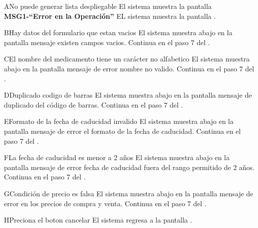  \begin{UCtrayectoriaA}{A}{No puede generar lista despliegable}
 	\UCpaso El sistema muestra la pantalla {\bf MSG1-``Error en la Operación''}
 	\UCpaso EL sistema muestra la pantalla .
 \end{UCtrayectoriaA}
 \begin{UCtrayectoriaA}{B}{Hay datos del formulario que estan vacios}
 	\UCpaso El sistema muestra abajo en la pantalla mensaje existen campos vacios.
 	\UCpaso Continua en el paso 7 del .
 \end{UCtrayectoriaA}		
 \begin{UCtrayectoriaA}{C}{El nombre del medicamento tiene un carácter no alfabetico}
 	\UCpaso El sistema muestra abajo en la pantalla mensaje de error nombre no valido.
 	\UCpaso Continua en el paso 7 del .
 \end{UCtrayectoriaA}
 \begin{UCtrayectoriaA}{D}{Duplicado codigo de barras}
 	\UCpaso El sistema muestra abajo en la pantalla mensaje de duplicado del código de barras.
 	\UCpaso Continua en el paso 7 del .
 \end{UCtrayectoriaA}
 \begin{UCtrayectoriaA}{E}{Formato de la fecha de caducidad invalido}
 	\UCpaso El sistema muestra abajo en la pantalla mensaje de error el formato de la fecha de caducidad.
 	\UCpaso Continua en el paso 7 del .
 \end{UCtrayectoriaA}
 \begin{UCtrayectoriaA}{F}{La fecha de caducidad es menor a 2 años}
 	\UCpaso El sistema muestra abajo en la pantalla mensaje de error fecha de caducidad fuera del rango permitido de 2 años.
 	\UCpaso Continua en el paso 7 del .
 \end{UCtrayectoriaA}
 \begin{UCtrayectoriaA}{G}{Condición de precio es falsa}
 	\UCpaso El sistema muestra abajo en la pantalla mensaje de error en los precios de compra y venta.
 	\UCpaso Continua en el paso 7 del .
 \end{UCtrayectoriaA}
 \begin{UCtrayectoriaA}{H}{Preciona el boton cancelar}
 	\UCpaso El sistema regresa a la pantalla  .
 \end{UCtrayectoriaA}		